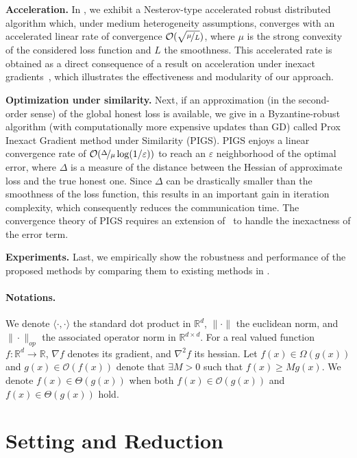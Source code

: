 \documentclass{article}
\def\eps{{\varepsilon}}
\newcommand{\R}{\mathbb{R}}
\newcommand{\cO}{\mathcal{O}}
\theoremstyle{plain}
\theoremstyle{definition}
\theoremstyle{remark}
\begin{document}
\textbf{Acceleration.}  In , we exhibit a Nesterov-type accelerated robust distributed algorithm which, under medium heterogeneity assumptions, converges with an accelerated linear rate of convergence $\mathcal{O}(\sqrt{\nicefrac{\mu}{L}})$, where $\mu$ is the strong convexity of the considered loss function and $L$ the smoothness. This accelerated rate is obtained as a direct consequence of a result on acceleration under inexact gradients~\citep{devolder2014first}, which illustrates the effectiveness and modularity of our approach.

\textbf{Optimization under similarity.} Next,  if an approximation (in the second-order sense) of the global honest loss is available, we give in  a Byzantine-robust algorithm (with computationally more expensive updates than GD) called Prox Inexact Gradient method under Similarity (PIGS). PIGS enjoys a linear convergence rate of $\mathcal{O}(\nicefrac{\Delta}{\mu}\log(1/\eps))$ to reach an $\eps$ neighborhood of the optimal error, where $\Delta$ is a measure of the distance between the Hessian of approximate loss and the true honest one. Since $\Delta$ can be drastically smaller than the smoothness of the loss function, this results in an important gain in iteration complexity, which consequently reduces the communication time. The convergence theory of PIGS requires an extension of~\citet{woodworth2023two} to handle the inexactness of the error term.

\textbf{Experiments.} Last, we empirically show the robustness and performance of the proposed methods by comparing them to existing methods in .


\paragraph{Notations.} We denote $\langle \cdot, \cdot \rangle$ the standard dot product in $\R^d$,  $\|\cdot\|$ the euclidean norm,  and $\|\cdot\|_{op}$ the associated operator norm in $\R^{d\times d}$. For a real valued function $f:\R^d \rightarrow \R$, $\nabla f$ denotes its gradient, and $\nabla^2 f$ its hessian. Let $f(x) \in \Omega(g(x))$ and $g(x) \in \cO(f(x))$ denote that $\exists M>0$ such that $f(x) \ge M g(x)$. We denote $f(x) \in \Theta(g(x))$ when both $f(x)\in \cO(g(x))$ and $f(x) \in \Theta(g(x))$ hold.

\section{Setting and Reduction}
\end{document}
